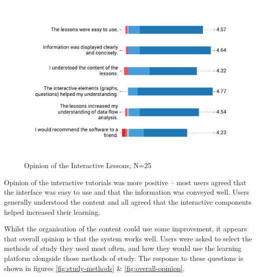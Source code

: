 \documentclass[bsc,twoside,singlespacing,parskip,logo,notimes,normalheadings]{infthesis}
\begin{document}
    \begin{figure}[!htb]
      \centering
      \captionsetup{width=\textwidth, justification=centering}
      \caption{Opinion of the Interactive Lessons, N=25}\label{fig:opinion-lessons}
      \includegraphics[width=\textwidth, trim=0 50 0 50, clip]{img/lesson_opinion.pdf}
    \end{figure}

    Opinion of the interactive tutorials was more positive -- most
    users agreed that the interface was easy to use and that the
    information was conveyed well. Users generally understood the
    content and all agreed that the interactive components helped
    increased their learning.

    Whilst the organisation of the content could use some improvement,
    it appears that overall opinion is that the system works
    well. Users were asked to select the methods of study they used
    most often, and how they would use the learning platform alongside
    those methods of study. The response to these questions is shown
    in figures \ref{fig:study-methods} \& \ref{fig:overall-opinion}.
\end{document}
